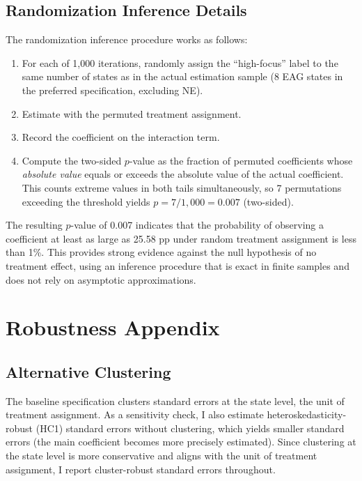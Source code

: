 \documentclass[12pt]{article}
\begin{document}
\subsection{Randomization Inference Details}

The randomization inference procedure works as follows:
\begin{enumerate}
    \item For each of 1,000 iterations, randomly assign the ``high-focus'' label to the same number of states as in the actual estimation sample (8 EAG states in the preferred specification, excluding NE).
    \item Estimate  with the permuted treatment assignment.
    \item Record the coefficient on the interaction term.
    \item Compute the two-sided $p$-value as the fraction of permuted coefficients whose \emph{absolute value} equals or exceeds the absolute value of the actual coefficient. This counts extreme values in both tails simultaneously, so 7 permutations exceeding the threshold yields $p = 7/1{,}000 = 0.007$ (two-sided).
\end{enumerate}

The resulting $p$-value of 0.007 indicates that the probability of observing a coefficient at least as large as 25.58 pp under random treatment assignment is less than 1\%. This provides strong evidence against the null hypothesis of no treatment effect, using an inference procedure that is exact in finite samples and does not rely on asymptotic approximations.


\section{Robustness Appendix}
\label{sec:app_robust}

\subsection{Alternative Clustering}

The baseline specification clusters standard errors at the state level, the unit of treatment assignment. As a sensitivity check, I also estimate heteroskedasticity-robust (HC1) standard errors without clustering, which yields smaller standard errors (the main coefficient becomes more precisely estimated). Since clustering at the state level is more conservative and aligns with the unit of treatment assignment, I report cluster-robust standard errors throughout.
\end{document}
